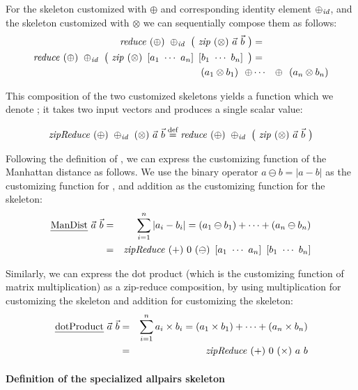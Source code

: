 For the \reduce skeleton customized with $\oplus$ and corresponding identity element $\oplus_\text{\textit{id}}$, and the \zip skeleton customized with $\otimes$ we can sequentially compose them as follows:
\begin{eqnarray*}
  \reduce\ (\oplus)\ \oplus_\id\ \big(\ \zip\ (\otimes)\ \vec{a}\ \vec{b}\ \big) &=&\\
  \reduce\ (\oplus)\ \oplus_\id\ \big(\ \zip\ (\otimes)\ \DottedVector{a_1}{a_n}\ \DottedVector{b_1}{b_n}\ \big) &=&\\
  (a_1 \otimes b_1)\ \ \oplus &\cdots& \oplus\ \ (a_n \otimes b_n)
\end{eqnarray*}

This composition of the two customized skeletons yields a function which we denote \zipReduce; it takes two input vectors and produces a single scalar value:

\begin{equation*}
  \zipReduce\ (\oplus)\ \oplus_\id\ (\otimes)\ \vec{a}\ \vec{b} \eqdef
  \reduce\ (\oplus)\ \oplus_\id\ \big(\ \zip\ (\otimes)\ \vec{a}\ \vec{b}\ \big)
\end{equation*}

Following the definition of \zipReduce, we can express the customizing function of the Manhattan distance as follows.
We use the binary operator $a \ominus b = |a - b|$ as the customizing function for \zip, and addition as the customizing function for the \reduce skeleton:
\begin{eqnarray*}
    \ManDist\ \vec{a}\ \vec{b} &=& \sum_{i=1}^{n} | a_i - b_i | = (a_1 \ominus b_1) + \cdots + (a_n \ominus b_n)\\
    &=& \zipReduce\ (+)\ 0\ (\ominus)\ \DottedVector{a_1}{a_n}\ \DottedVector{b_1}{b_n}
\end{eqnarray*}

Similarly, we can express the dot product (which is the customizing function of matrix multiplication) as a zip-reduce composition, by using multiplication for customizing the \zip skeleton and addition for customizing the \reduce skeleton:
\begin{eqnarray*}
  \mbox{\emph{dotProduct}}\ \vec{a}\ \vec{b} &=& \sum_{i = 1}^{n} a_i \times b_i = (a_1 \times b_1) + \cdots + (a_n \times b_n)\\
  &=& \text{\textit{zipReduce}}\ (+)\ 0\ (\times)\ a\ b
\end{eqnarray*}

\paragraph{Definition of the specialized allpairs skeleton}

